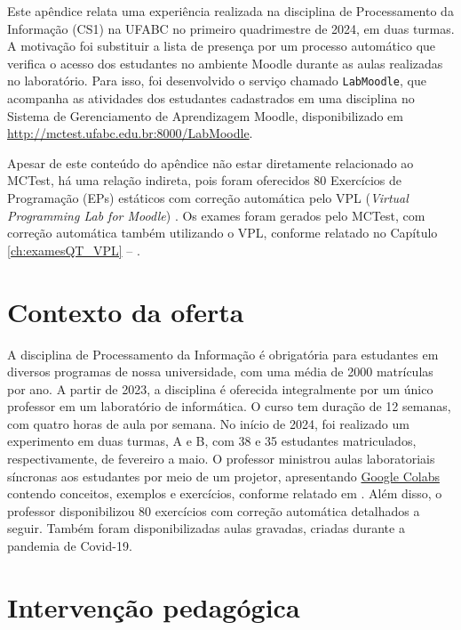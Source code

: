 \label{ch:apendice}

Este apêndice relata uma experiência realizada na disciplina de Processamento da Informação (CS1) na UFABC no primeiro quadrimestre de 2024, em duas turmas. A motivação foi substituir a lista de presença por um processo automático que verifica o acesso dos estudantes no ambiente Moodle durante as aulas realizadas no laboratório. Para isso, foi desenvolvido o serviço chamado \texttt{LabMoodle}, que acompanha as atividades dos estudantes cadastrados em uma disciplina no Sistema de Gerenciamento de Aprendizagem Moodle, disponibilizado em \url{http://mctest.ufabc.edu.br:8000/LabMoodle}.

Apesar de este conteúdo do apêndice não estar diretamente relacionado ao MCTest, há uma relação indireta, pois foram oferecidos 80 Exercícios de Programação (EPs) estáticos com correção automática pelo VPL (\textit{Virtual Programming Lab for Moodle}) \cite{rodriguez2012virtual}. Os exames foram gerados pelo MCTest, com correção automática também utilizando o VPL, conforme relatado no Capítulo \ref{ch:examesQT_VPL} -- .

\section{Contexto da oferta}

A disciplina de Processamento da Informação é obrigatória para estudantes em diversos programas de nossa universidade, com uma média de 2000 matrículas por ano. A partir de 2023, a disciplina é oferecida integralmente por um único professor em um laboratório de informática. O curso tem duração de 12 semanas, com quatro horas de aula por semana. No início de 2024, foi realizado um experimento em duas turmas, A e B, com 38 e 35 estudantes matriculados, respectivamente, de fevereiro a maio. O professor ministrou aulas laboratoriais síncronas aos estudantes por meio de um projetor, apresentando \href{https://colab.research.google.com}{Google Colabs} contendo conceitos, exemplos e exercícios, conforme relatado em . Além disso, o professor disponibilizou 80 exercícios com correção automática detalhados a seguir. Também foram disponibilizadas aulas gravadas, criadas durante a pandemia de Covid-19.



\section{Intervenção pedagógica}


